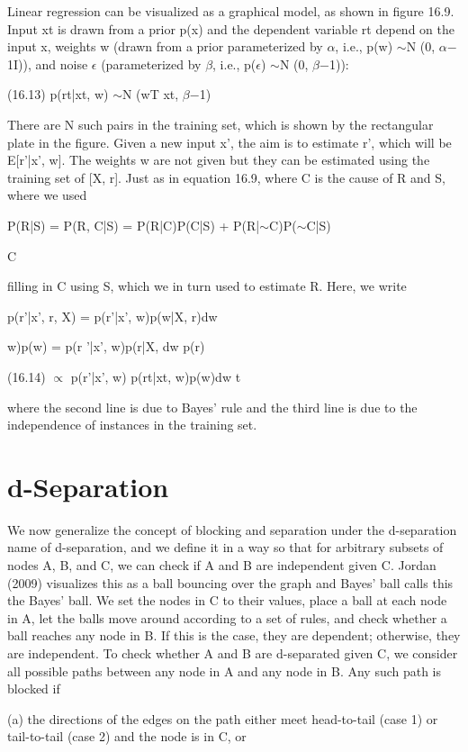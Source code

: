 Linear regression can be visualized as a graphical model, as shown in figure 16.9. Input xt is drawn from a prior p(x) and the dependent variable rt depend on the input x, weights w (drawn from a prior parameterized by $\alpha$, i.e., p(w) $\sim$N (0, $\alpha$$-$1I)), and noise $\epsilon$ (parameterized by $\beta$, i.e., p($\epsilon$) $\sim$N (0, $\beta$$-$1)):

(16.13) p(rt|xt, w) $\sim$N (wT xt, $\beta$$-$1)

There are N such pairs in the training set, which is shown by the rectangular plate in the figure. Given a new input x', the aim is to estimate r', which will be E[r'|x', w]. The weights w are not given but they can be estimated using the training set of [X, r]. Just as in equation 16.9, where C is the cause of R and S, where we used

P(R|S) = P(R, C|S) = P(R|C)P(C|S) + P(R|$\sim$C)P($\sim$C|S)

C

filling in C using S, which we in turn used to estimate R. Here, we write

p(r'|x', r, X) = p(r'|x', w)p(w|X, r)dw

w)p(w) = p(r '|x', w)p(r|X, dw p(r)

(16.14) $\propto$ p(r'|x', w) p(rt|xt, w)p(w)dw t

where the second line is due to Bayes’ rule and the third line is due to the independence of instances in the training set.

\section{d-Separation}

We now generalize the concept of blocking and separation under the d-separation name of d-separation, and we define it in a way so that for arbitrary subsets of nodes A, B, and C, we can check if A and B are independent given C. Jordan (2009) visualizes this as a ball bouncing over the graph and Bayes’ ball calls this the Bayes’ ball. We set the nodes in C to their values, place a ball at each node in A, let the balls move around according to a set of rules, and check whether a ball reaches any node in B. If this is the case, they are dependent; otherwise, they are independent. To check whether A and B are d-separated given C, we consider all possible paths between any node in A and any node in B. Any such path is blocked if

(a) the directions of the edges on the path either meet head-to-tail (case 1) or tail-to-tail (case 2) and the node is in C, or

